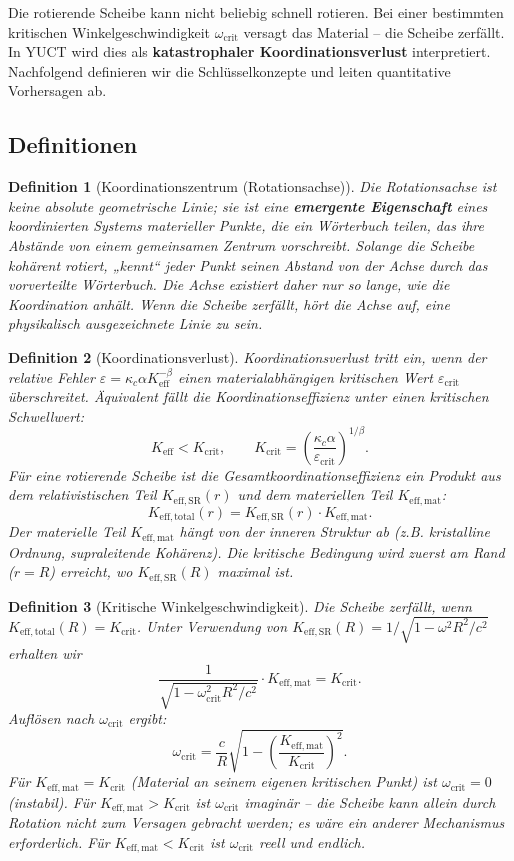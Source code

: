\documentclass[12pt,a4paper]{article}
\newtheorem{definition}{Definition}[section]
\newcommand{\kappac}{\kappa_c}
\newcommand{\betaf}{\beta}
\newcommand{\Keff}{K_{\mathrm{eff}}}
\newcommand{\Keffmat}{K_{\mathrm{eff,mat}}}
\newcommand{\Kefftot}{K_{\mathrm{eff,total}}}
\newcommand{\KeffSR}{K_{\mathrm{eff,SR}}}
\newcommand{\Kcrit}{K_{\mathrm{crit}}}
\begin{document}
	Die rotierende Scheibe kann nicht beliebig schnell rotieren. Bei einer bestimmten kritischen Winkelgeschwindigkeit \(\omega_{\text{crit}}\) versagt das Material – die Scheibe zerfällt. In YUCT wird dies als \textbf{katastrophaler Koordinationsverlust} interpretiert. Nachfolgend definieren wir die Schlüsselkonzepte und leiten quantitative Vorhersagen ab.
	
	\subsection{Definitionen}
	
	\begin{definition}[Koordinationszentrum (Rotationsachse)]
		Die Rotationsachse ist keine absolute geometrische Linie; sie ist eine \textbf{emergente Eigenschaft} eines koordinierten Systems materieller Punkte, die ein Wörterbuch teilen, das ihre Abstände von einem gemeinsamen Zentrum vorschreibt. Solange die Scheibe kohärent rotiert, „kennt“ jeder Punkt seinen Abstand von der Achse durch das vorverteilte Wörterbuch. Die Achse existiert daher nur so lange, wie die Koordination anhält. Wenn die Scheibe zerfällt, hört die Achse auf, eine physikalisch ausgezeichnete Linie zu sein.
	\end{definition}
	
	\begin{definition}[Koordinationsverlust]
		Koordinationsverlust tritt ein, wenn der relative Fehler \(\varepsilon = \kappac \alpha K_{\mathrm{eff}}^{-\betaf}\) einen materialabhängigen kritischen Wert \(\varepsilon_{\text{crit}}\) überschreitet. Äquivalent fällt die Koordinationseffizienz unter einen kritischen Schwellwert:
		\[
		\Keff < \Kcrit, \qquad \Kcrit = \left( \frac{\kappac \alpha}{\varepsilon_{\text{crit}}} \right)^{1/\betaf}.
		\]
		Für eine rotierende Scheibe ist die Gesamtkoordinationseffizienz ein Produkt aus dem relativistischen Teil \(K_{\mathrm{eff,SR}}(r)\) und dem materiellen Teil \(K_{\mathrm{eff,mat}}\):
		\[
		\Kefftot(r) = \KeffSR(r) \cdot \Keffmat.
		\]
		Der materielle Teil \(K_{\mathrm{eff,mat}}\) hängt von der inneren Struktur ab (z.B. kristalline Ordnung, supraleitende Kohärenz). Die kritische Bedingung wird zuerst am Rand (\(r = R\)) erreicht, wo \(\KeffSR(R)\) maximal ist.
	\end{definition}
	
	\begin{definition}[Kritische Winkelgeschwindigkeit]
		Die Scheibe zerfällt, wenn \(\Kefftot(R) = \Kcrit\). Unter Verwendung von \(\KeffSR(R) = 1/\sqrt{1 - \omega^2 R^2/c^2}\) erhalten wir
		\[
		\frac{1}{\sqrt{1 - \omega_{\text{crit}}^2 R^2/c^2}} \cdot \Keffmat = \Kcrit.
		\]
		Auflösen nach \(\omega_{\text{crit}}\) ergibt:
		\[
		\boxed{\omega_{\text{crit}} = \frac{c}{R} \sqrt{1 - \left( \frac{\Keffmat}{\Kcrit} \right)^2 }}.
		\]
		Für \(\Keffmat = \Kcrit\) (Material an seinem eigenen kritischen Punkt) ist \(\omega_{\text{crit}} = 0\) (instabil). Für \(\Keffmat > \Kcrit\) ist \(\omega_{\text{crit}}\) imaginär – die Scheibe kann allein durch Rotation nicht zum Versagen gebracht werden; es wäre ein anderer Mechanismus erforderlich. Für \(\Keffmat < \Kcrit\) ist \(\omega_{\text{crit}}\) reell und endlich.
	\end{definition}
	
\end{document}
